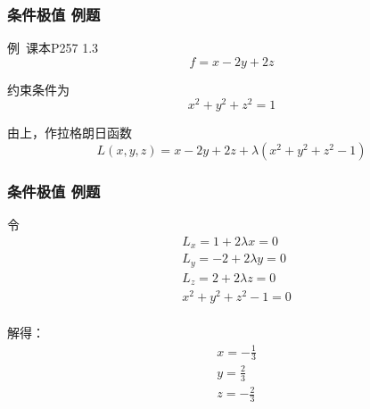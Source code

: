 \begin{frame}
    \frametitle{条件极值 例题}
    例\ 课本P257 1.3
    \begin{displaymath}
        f = x - 2y + 2z
    \end{displaymath}
    
    约束条件为
    \begin{displaymath}
        x^2 + y^2 + z^2 = 1
    \end{displaymath}\pause

    由上，作拉格朗日函数
    \begin{displaymath}
        L(x, y, z) = x - 2y + 2z + \lambda (x^2 + y^2 + z^2 - 1)
    \end{displaymath}

\end{frame}
\begin{frame}
    \frametitle{条件极值 例题}
    令
    \begin{displaymath}
        \begin{split}
            &L_x = 1 + 2\lambda x = 0\\
            &L_y = -2 + 2\lambda y = 0\\
            &L_z = 2 + 2\lambda z = 0\\
            &x^2 + y^2 + z^2 - 1 = 0\\
        \end{split}
    \end{displaymath}\pause

    解得：
    \begin{displaymath}
        \begin{split}
            &x = -\frac{1}{3} \\
            &y = \frac{2}{3} \\
            &z = -\frac{2}{3}
        \end{split}
    \end{displaymath}
\end{frame}
